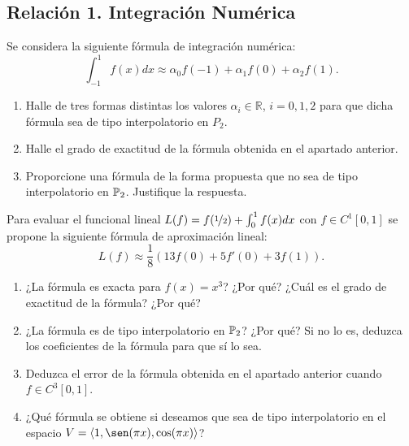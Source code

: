 \subsection{Relación 1. Integración Numérica}
\setcounter{ejercicio}{8}

\begin{ejercicio}\label{ej:2.1.9}
    Se considera la siguiente fórmula de integración numérica:
    \begin{equation*}
        \int_{-1}^{1} f(x) dx \approx \alpha_0 f(-1) + \alpha_1 f(0) + \alpha_2 f(1).
    \end{equation*}
    \begin{enumerate}
        \item Halle de tres formas distintas los valores $\alpha_i \in \mathbb{R}$, $i = 0, 1, 2$ para que dicha fórmula sea de tipo interpolatorio en $P_2$.
        \item Halle el grado de exactitud de la fórmula obtenida en el apartado anterior.
        \item Proporcione una fórmula de la forma propuesta que no sea de tipo interpolatorio en $\mathbb{P}_2$. Justifique la respuesta.
    \end{enumerate}
\end{ejercicio}

\begin{ejercicio}\label{ej:2.1.10}
    Para evaluar el funcional lineal $L(f) = f(\nicefrac{1}{2}) + \int_{0}^{1} f(x) dx$ con $f \in C^1[0, 1]$ se propone la siguiente fórmula de aproximación lineal:
    \begin{equation*}
        L(f) \approx \frac{1}{8} (13f(0) + 5f'(0) + 3f(1)).
    \end{equation*}
    \begin{enumerate}
        \item ¿La fórmula es exacta para $f(x) = x^3$? ¿Por qué? ¿Cuál es el grado de exactitud de la fórmula? ¿Por qué?
        \item ¿La fórmula es de tipo interpolatorio en $\mathbb{P}_2$? ¿Por qué? Si no lo es, deduzca los coeficientes de la fórmula para que sí lo sea.
        \item Deduzca el error de la fórmula obtenida en el apartado anterior cuando $f \in C^3[0, 1]$.
        \item ¿Qué fórmula se obtiene si deseamos que sea de tipo interpolatorio en el espacio $V = \langle 1, \sen(\pi x), \cos(\pi x)\rangle$?
    \end{enumerate}
\end{ejercicio}

